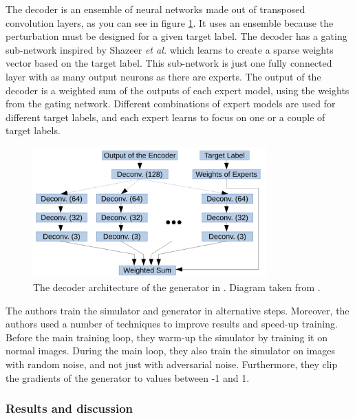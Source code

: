 The decoder is an ensemble of neural networks made out of transposed convolution layers, as you can see in figure \ref{fig:zheng_decoder}. It uses an ensemble because the perturbation must be designed for a given target label. The decoder has a gating sub-network inspired by Shazeer \textit{et al.} \cite{experts_mixture_gate} which learns to create a sparse weights vector based on the target label. This sub-network is just one fully connected layer with as many output neurons as there are experts. The output of the decoder is a weighted sum of the outputs of each expert model, using the weights from the gating network. Different combinations of expert models are used for different target labels, and each expert learns to focus on one or a couple of target labels.

\begin{figure}[ht]
    \centering
    \includegraphics[width=0.8\textwidth]{graphics/decoder.PNG}
    \caption{The decoder architecture of the generator in \cite{zheng_black_box_GAN}. Diagram taken from \cite{zheng_black_box_GAN}.}
    \label{fig:zheng_decoder}
\end{figure}

The authors train the simulator and generator in alternative steps. Moreover, the authors used a number of techniques to improve results and speed-up training. Before the main training loop, they warm-up the simulator by training it on normal images. During the main loop, they also train the simulator on images with random noise, and not just with adversarial noise. Furthermore, they clip the gradients of the generator to values between -1 and 1.

\subsubsection{Results and discussion}

